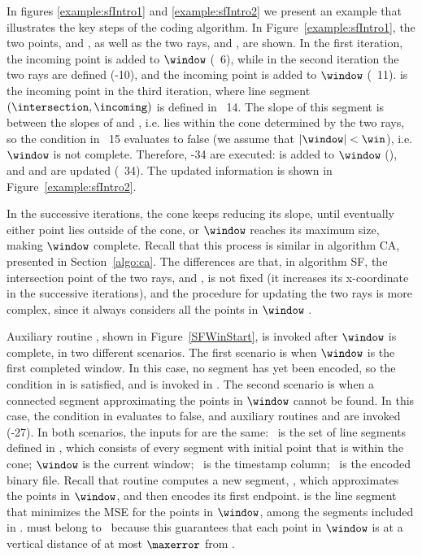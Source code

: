 In figures \ref{example:sfIntro1} and \ref{example:sfIntro2} we present an example that illustrates the key steps of the coding algorithm. In Figure~\ref{example:sfIntro1}, the two points, \incoming and \intersection, as well as the two rays, \smin and \smax, are shown. In the first iteration, the incoming point is added to $\window$ (\Line~6), while in the second iteration the two rays are defined (-10), and the incoming point is added to $\window$ (\Line~11). \incoming is the incoming point in the third iteration, where line segment $(\intersection, \incoming)$ is defined in \Line~14. The slope of this segment is between the slopes of \smin and \smax, i.e. \incoming lies within the cone determined by the two rays, so the condition in \Line~15 evaluates to false (we assume that $|\window|<\win$), i.e. $\window$ is not complete. Therefore, -34 are executed: \incoming is added to $\window$ (), and \smin and \smax are updated (\Line~34). The updated information is shown in Figure~\ref{example:sfIntro2}.


\vspace{+5pt}
\exampleSF


\clearpage


In the successive iterations, the cone keeps reducing its slope, until eventually either point \incoming lies outside of the cone, or $\window$ reaches its maximum size, making $\window$ complete. Recall that this process is similar in algorithm CA, presented in Section~\ref{algo:ca}. The differences are that, in algorithm SF, the intersection point of the two rays, \smin and \smax, is not fixed (it increases its x-coordinate in the successive iterations), and the procedure for updating the two rays is more complex, since it always considers all the points in $\window$ \cite{coder:sf}.


Auxiliary routine \SFWinStart, shown in Figure~\ref{SFWinStart}, is invoked after $\window$ is complete, in two different scenarios. The first scenario is when $\window$ is the first completed window. In this case, no segment has yet been encoded, so the condition in  is satisfied, and \SFWinStart is invoked in . The second scenario is when a connected segment approximating the points in $\window$ cannot be found. In this case, the condition in  evaluates to false, and auxiliary routines \SFWinEnd and \SFWinStart are invoked (-27). In both scenarios, the inputs for \SFWinStart are the same: \segmentSet\ is the set of line segments defined in , which consists of every segment with initial point \intersection that is within the cone; $\window$ is the current window; \tscol\ is the timestamp column; \out\ is the encoded binary file. Recall that routine \SFWinStart computes a new segment, \segmentS, which approximates the points in $\window$, and then encodes its first endpoint. \segmentS is the line segment that minimizes the MSE for the points in $\window$, among the segments included in \segmentSet. \segmentS must belong to \segmentSet\ because this guarantees that each point in $\window$ is at a vertical distance of at most $\maxerror$ from \segmentS.


